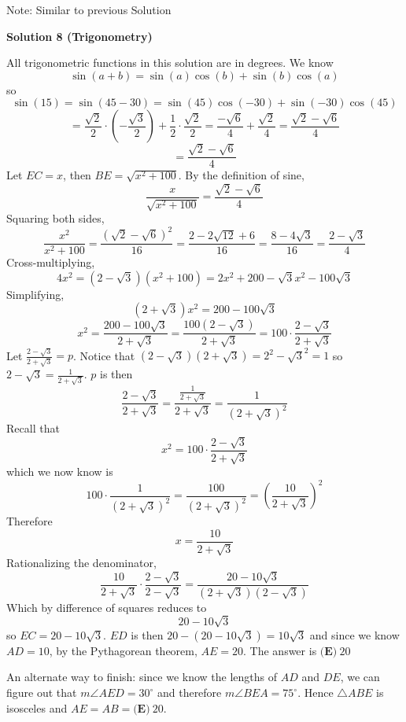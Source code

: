 \begin{enumerate}
 Note: Similar to previous Solution

 



\textbf{Solution 8 (Trigonometry)}

All trigonometric functions in this solution are in degrees. We know 
 \[\sin\left(a+b\right)=\sin\left(a\right)\cos\left(b\right)+\sin\left(b\right)\cos\left(a\right)\] so 
 \[\sin\left(15\right)=\sin\left(45-30\right)=\sin\left(45\right)\cos\left(-30\right)+\sin\left(-30\right)\cos\left(45\right)\]
 \[=\frac{\sqrt{2}}{2}\cdot\left(-\frac{\sqrt{3}}{2}\right)+\frac{1}{2}\cdot\frac{\sqrt{2}}{2}=\frac{-\sqrt{6}}{4}+\frac{\sqrt{2}}{4}=\frac{\sqrt{2}-\sqrt{6}}{4}\]
 \[=\frac{\sqrt{2}-\sqrt{6}}{4}\]Let $EC=x$, then $BE=\sqrt{x^{2}+100}$. By the definition of sine,
 \[\frac{x}{\sqrt{x^{2}+100}}=\frac{\sqrt{2}-\sqrt{6}}{4}\]Squaring both sides, 
 \[\frac{x^{2}}{x^{2}+100}=\frac{\left(\sqrt{2}-\sqrt{6}\right)^{2}}{16}=\frac{2-2\sqrt{12}+6}{16}=\frac{8-4\sqrt{3}}{16}=\frac{2-\sqrt{3}}{4}\]Cross-multiplying, 
 \[4x^{2}=\left(2-\sqrt{3}\right)\left(x^{2}+100\right)=2x^{2}+200-\sqrt{3}x^{2}-100\sqrt{3}\]Simplifying,
 \[\left(2+\sqrt{3}\right)x^{2}=200-100\sqrt{3}\]
 \[x^{2}=\frac{200-100\sqrt{3}}{2+\sqrt{3}}=\frac{100\left(2-\sqrt{3}\right)}{2+\sqrt{3}}=100\cdot\frac{2-\sqrt{3}}{2+\sqrt{3}}\]Let $\frac{2-\sqrt{3}}{2+\sqrt{3}}=p$. Notice that $\left(2-\sqrt{3}\right)\left(2+\sqrt{3}\right)=2^{2}-\sqrt{3}^{2}=1$ so $2-\sqrt{3}=\frac{1}{2+\sqrt{3}}$. $p$ is then 
 \[\frac{2-\sqrt{3}}{2+\sqrt{3}}=\frac{\frac{1}{2+\sqrt{3}}}{2+\sqrt{3}}=\frac{1}{\left(2+\sqrt{3}\right)^{2}}\]Recall that
 \[x^{2}=100\cdot\frac{2-\sqrt{3}}{2+\sqrt{3}}\] which we now know is 
 \[100\cdot\frac{1}{\left(2+\sqrt{3}\right)^{2}}=\frac{100}{\left(2+\sqrt{3}\right)^{2}}=\left(\frac{10}{2+\sqrt{3}}\right)^{2}\]Therefore 
 \[x=\frac{10}{2+\sqrt{3}}\]Rationalizing the denominator, 
 \[\frac{10}{2+\sqrt{3}}\cdot\frac{2-\sqrt{3}}{2-\sqrt{3}}=\frac{20-10\sqrt{3}}{\left(2+\sqrt{3}\right)\left(2-\sqrt{3}\right)}\]Which by difference of squares reduces to
 \[20-10\sqrt{3}\]so $EC=20-10\sqrt{3}$. $ED$ is then $20-\left(20-10\sqrt{3}\right)=10\sqrt{3}$ and since we know $AD=10$, by the Pythagorean theorem, $AE = 20$. The answer is $\boxed{\textbf{(E)}~20}$

 An alternate way to finish: since we know the lengths of $AD$ and $DE$, we can figure out that $m\angle AED=30^{\circ}$ and therefore $m\angle BEA=75^{\circ}$. Hence $\triangle ABE$ is isosceles and $AE=AB=\boxed{\textbf{(E)}~20}$.

 




\end{enumerate}
